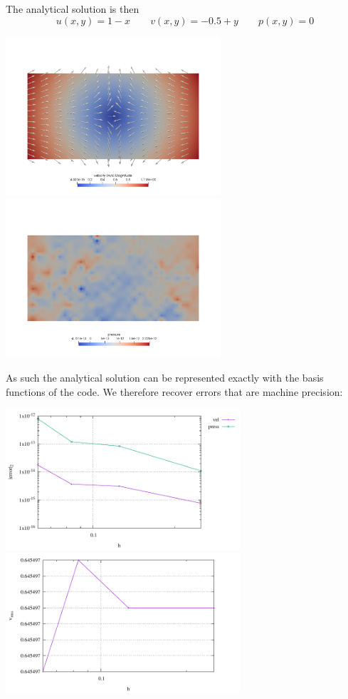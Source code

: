 \documentclass[a4paper]{article}
\begin{document}
The analytical solution is then
\[
u(x,y)=1-x
\qquad
v(x,y)=-0.5+y
\qquad
p(x,y)=0
\]

\begin{center}
\includegraphics[width=8cm]{./results/benchmark_pure_shear/vel}
\includegraphics[width=8cm]{./results/benchmark_pure_shear/press}
\end{center}

As such the analytical solution can be represented exactly
with the basis functions of the code.
We therefore recover errors that are machine precision:

\begin{center}
\includegraphics[width=8.7cm]{./results/benchmark_pure_shear/convergence.pdf}
\includegraphics[width=8.7cm]{./results/benchmark_pure_shear/vrms.pdf}
\end{center}
\end{document}
